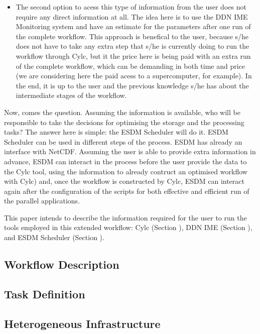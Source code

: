 \documentclass[a4paper, twocolumn]{article}
\begin{document}
\begin{itemize}
\begin{description}
\begin{itemize}
\end{itemize}

\end{description}

\item The second option to acess this type of information from the user does not require any direct information at all. The idea here is to use the DDN IME Monitoring system and have an estimate for the parameters after one run of the complete workflow. This approach is benefical to the user, because s/he does not have to take any extra step that s/he is currently doing to run the workflow through Cylc, but it the price here is being paid with an extra run of the complete workflow, which can be demanding in both time and price (we are considering here the paid acess to a supercomputer, for example). In the end, it is up to the user and the previous knowledge s/he has about the intermediate stages of the workflow.

\end{itemize}

Now, comes the question. Assuming the information is available, who will be responsible to take the decisions for optimising the storage and the processing tasks? The answer here is simple: the ESDM Scheduler will do it. ESDM Scheduler can be used in different steps of the process. ESDM has already an interface with NetCDF. Assuming the user is able to provide extra information in advance, ESDM can interact in the process before the user provide the data to the Cylc tool, using the information to already contruct an optimised workflow with Cylc) and, once the workflow is constructed by Cylc, ESDM can interact again after the configuration of the scripts for both effective and efficient run of the parallel applications.

This paper intends to describe the information required for the user to run the tools employed in this extended workflow: Cylc (Section ), DDN IME (Section ), and ESDM Scheduler (Section ).

\subsection{Workflow Description}
\subsection{Task Definition}
\subsection{Heterogeneous Infrastructure}
\end{document}
